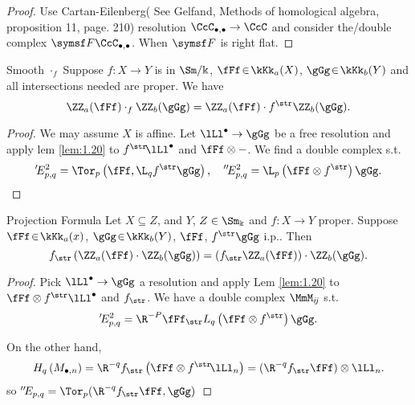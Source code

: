\begin{proof}
	Use Cartan-Eilenberg( See Gelfand, Methods of homological algebra, proposition 11, page. 210) resolution $\CcC_{\bullet, \bullet}\rightarrow \CcC$ and consider the/double complex $\symsf F\CcC_{\bullet,\bullet}$. When $\symsf F$ is right flat. 
\end{proof}

\begin{proposition}{Smooth $\cdot_f$}{}
	Suppose $f: X \rightarrow Y$ is in $\Sm /\Bbbk$, $\fFf\!\in\!\kKk_a(X)$, $\gGg\!\in\!\kKk_b(Y)$ and all intersections needed are proper. We have
	$$
	\ZZ_a(\fFf) \cdot_f \ZZ_b(\gGg)=\ZZ_a(\fFf) \cdot f^{\str} \ZZ_b(\gGg).
	$$
\end{proposition}

\begin{proof}
	We may assume $X$ is affine. Let $\lLl^{\bullet} \rightarrow \gGg$ be a free resolution and apply lem \ref{lem:1.20} to $f^{\str}\! \lLl^{\bullet}$ and $\fFf\otimes -$. We find a double complex s.t.
	$$
	'\!{E_{p,q}^2}=\Tor_p\left(\fFf, \L_q f^{\str} \gGg\right),\quad ''\!E_{p, q}^2= \L_p\left(\fFf \otimes f^{\str}\right)\gGg.
	$$
\end{proof}

\begin{proposition}{Projection Formula}{}
	Let $X \subseteq Z$, and $Y$, $Z \in \Sm_{\Bbbk}$ and $f\colon X \rightarrow Y$ proper. Suppose $\fFf \!\in\!\kKk_a(x)$, $\gGg\!\in\!\kKk_b(Y)$, $\fFf$, $f^{\str} \gGg$ i.p.. Then
	$$
	f_{\str}\left(\ZZ_a(\fFf) \cdot \ZZ_b(\gGg)\right)=\left(f_{\str} \ZZ_a(\fFf)\right) \cdot \ZZ_b(\gGg) .
	$$
\end{proposition}
\begin{proof}

	Pick $\lLl^{\bullet} \rightarrow \gGg$ a resolution and apply Lem \ref{lem:1.20} to $\fFf
	\otimes f^{\str}\lLl^{\bullet}$ and $f_{\str}$. We have a double complex $\MmM_{i\!j}$
	s.t. $$ '\!E_{p, q}^2=\R^{-P} \fFf_{\str} L_q\left(\fFf \otimes f^{\str}\right) \gGg. $$

	On the other hand,
	\[
			H_q\left(M_{\bullet, n}\right)=\R^{-q} f_{\str}\left(\fFf \otimes f^{\str}\!\lLl_n\right)=(\R^{-q}f_{\str}\fFf)\otimes \lLl_n.
	\]
	so $''\!E_{p,q}=\Tor_p(\R^{-q}f_{\str}\fFf,\gGg)$
\end{proof}

